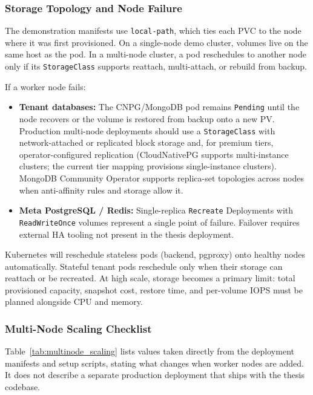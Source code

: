 \subsubsection{Storage Topology and Node Failure}

The demonstration manifests use \texttt{local-path}, which ties each PVC to the node where it was first provisioned. On a single-node demo cluster, volumes live on the same host as the pod. In a multi-node cluster, a pod reschedules to another node only if its \texttt{StorageClass} supports reattach, multi-attach, or rebuild from backup.

If a worker node fails:

\begin{itemize}
    \item \textbf{Tenant databases:} The CNPG/MongoDB pod remains \texttt{Pending} until the node recovers or the volume is restored from backup onto a new PV. Production multi-node deployments should use a \texttt{StorageClass} with network-attached or replicated block storage and, for premium tiers, operator-configured replication (CloudNativePG supports multi-instance clusters; the current tier mapping provisions single-instance clusters). MongoDB Community Operator supports replica-set topologies across nodes when anti-affinity rules and storage allow it.
    \item \textbf{Meta PostgreSQL / Redis:} Single-replica \texttt{Recreate} Deployments with \texttt{ReadWriteOnce} volumes represent a single point of failure. Failover requires external HA tooling not present in the thesis deployment.
\end{itemize}

Kubernetes will reschedule stateless pods (backend, pgproxy) onto healthy nodes automatically. Stateful tenant pods reschedule only when their storage can reattach or be recreated. At high scale, storage becomes a primary limit: total provisioned capacity, snapshot cost, restore time, and per-volume IOPS must be planned alongside CPU and memory.

\subsubsection{Multi-Node Scaling Checklist}

Table~\ref{tab:multinode_scaling} lists values taken directly from the deployment manifests and setup scripts, stating what changes when worker nodes are added. It does not describe a separate production deployment that ships with the thesis codebase.

